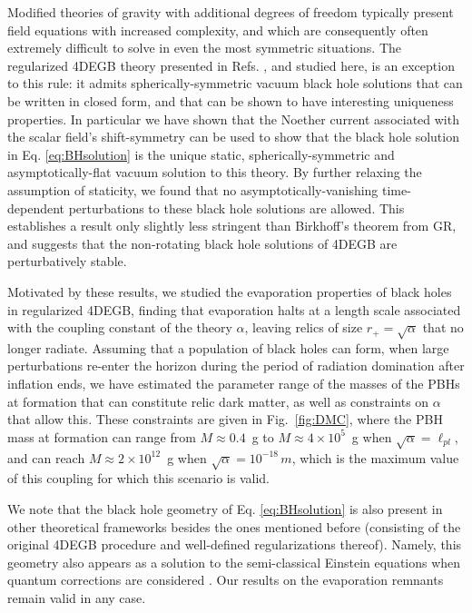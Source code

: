 \documentclass[reprint,amsmath,amssymbGaps,onecolumn,notitlepage,nofootinbib]{revtex4-1}
\begin{document}
\par Modified theories of gravity with additional degrees of freedom typically present field equations with increased complexity, and which are consequently often extremely difficult to solve in even the most symmetric situations. The regularized 4DEGB theory presented in Refs. \cite{Fernandes:2020nbq,Hennigar:2020lsl,Lu:2020iav,Kobayashi:2020wqy,Fernandes:2021dsb,Riegert:1984kt,Komargodski:2011vj}, and studied here, is an exception to this rule: it admits spherically-symmetric vacuum black hole solutions that can be written in closed form, and that can be shown to have interesting uniqueness properties. In particular we have shown that the Noether current associated with the scalar field's shift-symmetry can be used to show that the black hole solution in Eq. \eqref{eq:BHsolution} is the unique static, spherically-symmetric and asymptotically-flat vacuum solution to this theory. By further relaxing the assumption of staticity, we found that no asymptotically-vanishing time-dependent perturbations to these black hole solutions are allowed. This establishes a result only slightly less stringent than Birkhoff's theorem from GR, and suggests that the non-rotating black hole solutions of 4DEGB are perturbatively stable. 

Motivated by these results, we studied the evaporation properties of black holes in regularized 4DEGB, finding that evaporation halts at a length scale associated with the coupling constant of the theory $\alpha$, leaving relics of size $r_+ = \sqrt{\alpha}$ that no longer radiate. Assuming that a population of black holes can form, when large perturbations re-enter the horizon during the period of radiation domination after inflation ends, we have estimated the parameter range of the masses of the PBHs at formation that can constitute relic dark matter, as well as constraints on $\alpha$ that allow this. These constraints are given in Fig.~\ref{fig:DMC}, where the PBH mass at formation can range from $M \approx 0.4$~g to $M \approx 4\times10^5$~g when $\sqrt{\alpha}=\ell_{pl}$, and can reach $M \approx 2\times 10^{12}$~g when $\sqrt{\alpha} = 10^{-18} \, m$, which is the maximum value of this coupling for which this scenario is valid.

We note that the black hole geometry of Eq. \eqref{eq:BHsolution} is also present in other theoretical frameworks besides the ones mentioned before \cite{Glavan:2019inb,Lu:2020iav,Kobayashi:2020wqy,Fernandes:2020nbq,Hennigar:2020lsl, Aoki:2020lig,Fernandes:2021dsb} (consisting of the original 4DEGB procedure and well-defined regularizations thereof). Namely, this geometry also appears as a solution to the semi-classical Einstein equations when quantum corrections are considered \cite{Cai:2009ua,Cai:2014jea}. Our results on the evaporation remnants remain valid in any case. %
\end{document}
